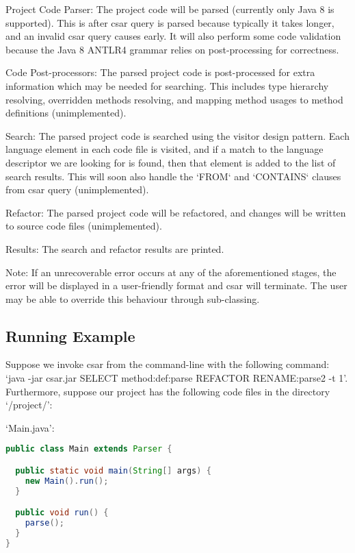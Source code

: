 \documentclass[12pt, letterpaper]{article}
\begin{document}
Project Code Parser:\newline
The project code will be parsed (currently only Java 8 is supported).
This is after csar query is parsed because typically it takes longer, and an invalid csar query causes early.
It will also perform some code validation because the Java 8 ANTLR4 grammar relies on post-processing for correctness.

Code Post-processors:\newline
The parsed project code is post-processed for extra information which may be needed for searching.
This includes type hierarchy resolving, overridden methods resolving, and mapping method usages to method definitions (unimplemented).

Search:\newline
The parsed project code is searched using the visitor design pattern.
Each language element in each code file is visited, and if a match to the language descriptor we are looking for is found, then that element is added to the list of search results.
This will soon also handle the `FROM` and `CONTAINS` clauses from csar query (unimplemented).

Refactor:\newline
The parsed project code will be refactored, and changes will be written to source code files (unimplemented).

Results:\newline
The search and refactor results are printed.

Note: If an unrecoverable error occurs at any of the aforementioned stages, the error will be displayed in a user-friendly format and csar will terminate.
The user may be able to override this behaviour through sub-classing.

\subsection{Running Example}
Suppose we invoke csar from the command-line with the following command: `java -jar csar.jar SELECT method:def:parse REFACTOR RENAME:parse2 -t 1'.
Furthermore, suppose our project has the following code files in the directory `/project/':

`Main.java':
\begin{lstlisting}[language=Java]
public class Main extends Parser {

  public static void main(String[] args) {
    new Main().run();
  }

  public void run() {
    parse();
  }
}
\end{lstlisting}
\end{document}
